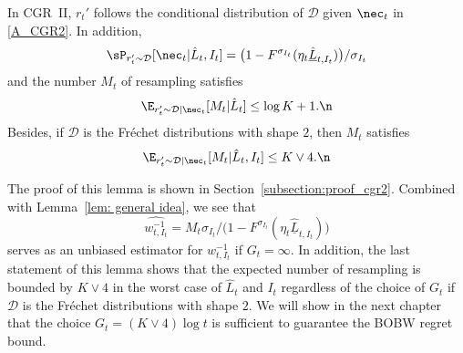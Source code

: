 \begin{lemma}\label{lem: complexity of CGR2}
    In CGR~II, $r_t'$ follows the conditional distribution of $\mathcal{D}$ given
$\nec_t$ in \eqref{A_CGR2}.
    In addition,
    \begin{align*}
    \sP_{r_t' \sim \mathcal{D}}[\nec_t|\hat{L}_t,I_t]=\big(1-F^{\sigma_{I_t}}(\eta_t\underline{\hat{L}}_{t,I_t})\big)/\sigma_{I_t}
    \end{align*} 
    and the number $M_t$ of resampling satisfies
    \begin{align}
        \E_{r_t' \sim \mathcal{D}|\nec_t}[M_t|\hat{L}_t]\leq\log K+1.\n
    \end{align}
    Besides, if $\mathcal{D}$
is
the Fr\'{e}chet distributions with shape $2$, then $M_t$ satisfies
    \begin{align}
        \E_{r_t' \sim \mathcal{D}|\nec_t}[M_t|\hat{L}_t,I_t]\leq K\lor 4.\n
    \end{align}
\end{lemma}
The proof of this lemma is shown in Section~\ref{subsection:proof_cgr2}.
Combined with Lemma~\ref{lem: general idea},
we see that
$$\widehat{w_{t,I_t}^{-1}}=M_t\sigma_{I_t}/\big(1-F^{\sigma_{I_t}}(\eta_t\underline{\hat{L}}_{t,I_t})\big)$$
serves as an unbiased estimator for $w_{t,I_t}^{-1}$ if $G_t=\infty$.
In addition, the last statement of this lemma shows that
the expected number of resampling
is bounded by $K\lor 4$
in the worst case of $\hat{L}_t$ and $I_t$
regardless of the choice of $G_t$
if $\mathcal{D}$ is the Fr\'{e}chet distributions with shape $2$.
We will show in the next chapter that the choice $G_t=(K\lor 4)\log t$ is sufficient to guarantee the BOBW regret bound.

